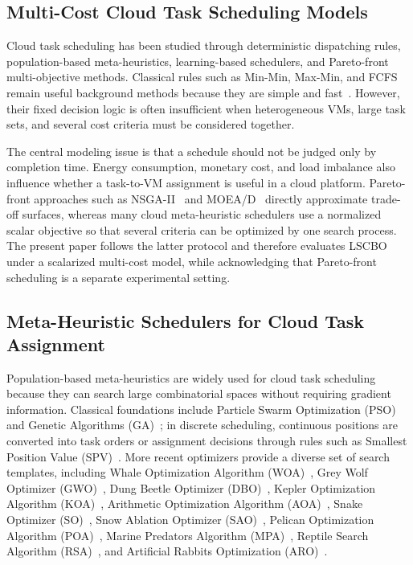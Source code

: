 \documentclass[pdflatex,onecolumn,sn-mathphys-num]{sn-jnl}
\begin{document}
\subsection{Multi-Cost Cloud Task Scheduling Models}
Cloud task scheduling has been studied through deterministic dispatching rules, population-based meta-heuristics, learning-based schedulers, and Pareto-front multi-objective methods. Classical rules such as Min-Min, Max-Min, and FCFS remain useful background methods because they are simple and fast~\cite{Braun2001,Etminani2007}. However, their fixed decision logic is often insufficient when heterogeneous VMs, large task sets, and several cost criteria must be considered together.

The central modeling issue is that a schedule should not be judged only by completion time. Energy consumption, monetary cost, and load imbalance also influence whether a task-to-VM assignment is useful in a cloud platform. Pareto-front approaches such as NSGA-II~\cite{Deb2002} and MOEA/D~\cite{Zhang2007} directly approximate trade-off surfaces, whereas many cloud meta-heuristic schedulers use a normalized scalar objective so that several criteria can be optimized by one search process. The present paper follows the latter protocol and therefore evaluates LSCBO under a scalarized multi-cost model, while acknowledging that Pareto-front scheduling is a separate experimental setting.

\subsection{Meta-Heuristic Schedulers for Cloud Task Assignment}
Population-based meta-heuristics are widely used for cloud task scheduling because they can search large combinatorial spaces without requiring gradient information. Classical foundations include Particle Swarm Optimization (PSO)~\cite{Kennedy1995} and Genetic Algorithms (GA)~\cite{Goldberg1989}; in discrete scheduling, continuous positions are converted into task orders or assignment decisions through rules such as Smallest Position Value (SPV)~\cite{Tasgetiren2007}. More recent optimizers provide a diverse set of search templates, including Whale Optimization Algorithm (WOA)~\cite{Mirjalili2016}, Grey Wolf Optimizer (GWO)~\cite{Mirjalili2014}, Dung Beetle Optimizer (DBO)~\cite{Xue2022}, Kepler Optimization Algorithm (KOA)~\cite{AbdelBasset2023,Qian2025}, Arithmetic Optimization Algorithm (AOA)~\cite{Abualigah2021}, Snake Optimizer (SO)~\cite{Hashim2022}, Snow Ablation Optimizer (SAO)~\cite{Deng2023}, Pelican Optimization Algorithm (POA)~\cite{Trojovska2022}, Marine Predators Algorithm (MPA)~\cite{Faramarzi2020}, Reptile Search Algorithm (RSA)~\cite{Abualigah2022}, and Artificial Rabbits Optimization (ARO)~\cite{Wang2022}.
\end{document}

